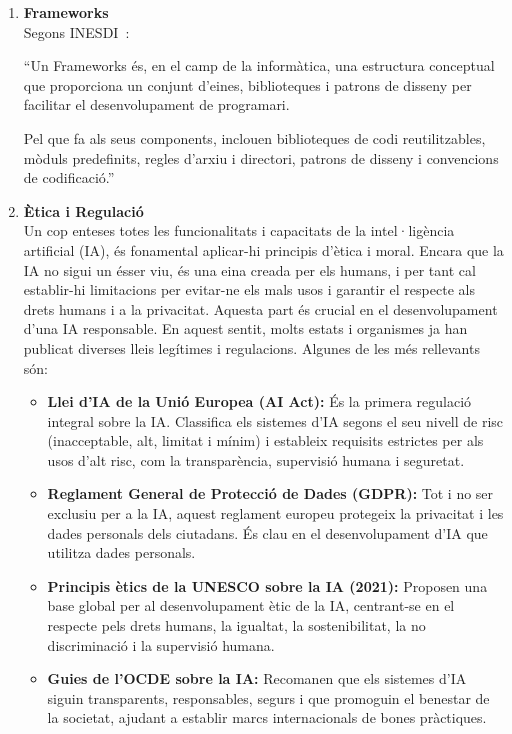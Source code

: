 \begin{enumerate}
    \item \textbf{Frameworks}\\
    Segons INESDI~\cite{INESDI}:\\
    {\color{gray}``Un Frameworks és, en el camp de la informàtica, una estructura conceptual que proporciona un conjunt d'eines, biblioteques i patrons de disseny per facilitar el desenvolupament de programari.

    Pel que fa als seus components, inclouen biblioteques de codi reutilitzables, mòduls predefinits, regles d'arxiu i directori, patrons de disseny i convencions de codificació.''}

    \item \textbf{Ètica i Regulació}\\
    Un cop enteses totes les funcionalitats i capacitats de la intel·ligència artificial (IA), és fonamental aplicar-hi principis d'ètica i moral. Encara que la IA no sigui un ésser viu, és una eina creada per els humans, i per tant cal establir-hi limitacions per evitar-ne els mals usos i garantir el respecte als drets humans i a la privacitat. Aquesta part és crucial en el desenvolupament d'una IA responsable. En aquest sentit, molts estats i organismes ja han publicat diverses lleis legítimes i regulacions. Algunes de les més rellevants són:
    \begin{itemize}
        \item \textbf{Llei d'IA de la Unió Europea (AI Act):} És la primera regulació integral sobre la IA. Classifica els sistemes d'IA segons el seu nivell de risc (inacceptable, alt, limitat i mínim) i estableix requisits estrictes per als usos d'alt risc, com la transparència, supervisió humana i seguretat.
        \item \textbf{Reglament General de Protecció de Dades (GDPR):} Tot i no ser exclusiu per a la IA, aquest reglament europeu protegeix la privacitat i les dades personals dels ciutadans. És clau en el desenvolupament d'IA que utilitza dades personals.
        \item \textbf{Principis ètics de la UNESCO sobre la IA (2021):} Proposen una base global per al desenvolupament ètic de la IA, centrant-se en el respecte pels drets humans, la igualtat, la sostenibilitat, la no discriminació i la supervisió humana.
        \item \textbf{Guies de l'OCDE sobre la IA:} Recomanen que els sistemes d'IA siguin transparents, responsables, segurs i que promoguin el benestar de la societat, ajudant a establir marcs internacionals de bones pràctiques.
    \end{itemize}
\end{enumerate}

